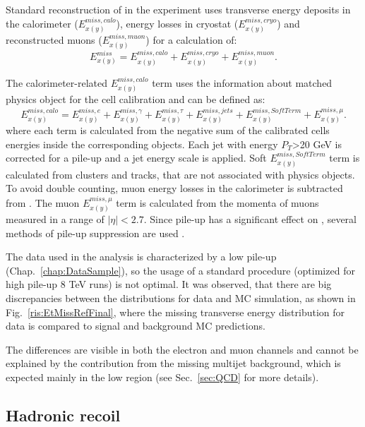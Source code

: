 Standard reconstruction of \etmiss in the \atlas experiment \cite{Aad2012} uses transverse energy deposits in the calorimeter ($E_{x(y)}^{miss, calo}$), energy losses in cryostat ($E_{x(y)}^{miss, cryo}$)  and reconstructed muons ($E_{x(y)}^{miss, muon}$) for a calculation of:
\begin{equation}
E_{x(y)}^{miss} = E_{x(y)}^{miss, calo} +  E_{x(y)}^{miss, cryo} +  E_{x(y)}^{miss, muon}.
\end{equation}

The calorimeter-related $E_{x(y)}^{miss, calo}$ term uses the information about matched physics object for the cell calibration and can be defined as:
\begin{equation}
E_{x(y)}^{miss, calo} = E_{x(y)}^{miss, e} + E_{x(y)}^{miss, \gamma} + E_{x(y)}^{miss, \tau} + E_{x(y)}^{miss, jets} + E_{x(y)}^{miss,SoftTerm} + E_{x(y)}^{miss, \mu}.
\end{equation}
where each term is calculated from the negative sum of the calibrated cells energies inside the corresponding objects. Each jet with energy $P_T$>20 GeV is corrected for a pile-up and a jet energy scale is applied. Soft $E_{x(y)}^{miss,SoftTerm}$ term is calculated from clusters and tracks, that are not associated with physics objects. To avoid double counting, muon energy losses  in the calorimeter is  subtracted from \etmiss.  The muon $E_{x(y)}^{miss, \mu}$ term is calculated from the momenta of muons measured in a range of $| \eta | < 2.7 $. Since pile-up has a significant effect on \etmiss, several methods of pile-up suppression are used \cite{ATLAS-CONF-2014-019}.

The data used in the analysis is characterized by a low pile-up (Chap.~\ref{chap:DataSample}), so the usage of a standard \atlas procedure (optimized for high pile-up 8 TeV runs) is not optimal. It was observed, that there are big discrepancies between the \etmiss distributions for data and MC simulation, as shown in Fig.~\ref{ris:EtMissRefFinal}, where the missing transverse energy distribution for data is compared to signal and background MC predictions. 

The differences are visible in both the electron and muon channels and cannot be explained by the contribution from the missing multijet background, which is expected mainly in the low \etmiss region (see Sec.~\ref{sec:QCD} for more details). 



\subsection{Hadronic recoil}


